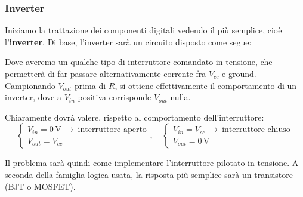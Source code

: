 \documentclass[a4paper,11pt]{article}
\begin{document}
\subsubsection{Inverter}
Iniziamo la trattazione dei componenti digitali vedendo il più semplice, cioè l'\textbf{inverter}. Di base, l'inverter sarà un circuito disposto come segue:
\begin{center}
\end{center}

Dove averemo un qualche tipo di interruttore comandato in tensione, che permetterà di far passare alternativamente corrente fra $V_{cc}$ e ground. Campionando $V_{out}$ prima di $R$, si ottiene effettivamente il comportamento di un inverter, dove a $V_{in}$ positiva corrisponde $V_{out}$ nulla.

Chiaramente dovrà valere, rispetto al comportamento dell'interruttore:
$$
\begin{cases}
	V_{in} = 0 \, \mathrm{V} \ \rightarrow \ \text{interruttore aperto} \\
	V_{out} = V_{cc}
\end{cases}, \quad
\begin{cases}
	V_{in} = V_{cc} \ \rightarrow \ \text{interruttore chiuso} \\
	V_{out} = 0 \, \mathrm{V} 
\end{cases}
$$

Il problema sarà quindi come implementare l'interruttore pilotato in tensione. A seconda della famiglia logica usata, la risposta più semplice sarà un transistore (BJT o MOSFET).
\end{document}
